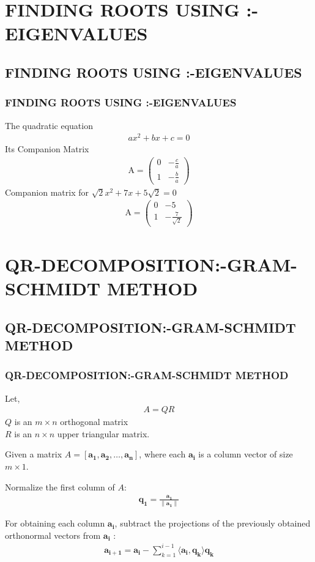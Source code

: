 \documentclass{beamer}
\theoremstyle{remark}
\providecommand{\norm}[1]{\lVert#1\rVert}
\newcommand{\myvec}[1]{\ensuremath{\begin{pmatrix}#1\end{pmatrix}}}
\let\vec\mathbf
\numberwithin{equation}{section}
\begin{document}
\section{FINDING ROOTS USING :-EIGENVALUES }
\subsection{FINDING ROOTS USING :-EIGENVALUES}
\begin{frame}
\frametitle{FINDING ROOTS USING :-EIGENVALUES}

The quadratic equation 
\begin{align}
ax^2 + bx + c = 0
\end{align}
Its Companion Matrix
\begin{align}
\text{A} =
\myvec{0 & -\frac{c}{a} \\
1 & -\frac{b}{a}
}
\end{align}
Companion matrix for $\sqrt{2}x^2 + 7x + 5\sqrt{2} = 0$
\begin{align}
\text{A} =
\myvec{0 & -5 \\
1 & -\frac{7}{\sqrt{2}}
}
\end{align}

\end{frame}


\section{QR-DECOMPOSITION:-GRAM-SCHMIDT METHOD}
\subsection{QR-DECOMPOSITION:-GRAM-SCHMIDT METHOD}
\begin{frame}
\frametitle{QR-DECOMPOSITION:-GRAM-SCHMIDT METHOD}
Let,
\begin{align}
A = QR
\end{align}
$Q$ is an $ m \times n $ orthogonal matrix\\
$R$ is an $n \times n$ upper triangular matrix.

Given a matrix $ A = [\vec{a_1}, \vec{a_2}, \dots, \vec{a_n}] $, where each $ \vec{a_i} $ is a column vector of size $ m \times 1 $.

Normalize the first column of $A$:
\begin{align}
\vec{q_1} = \frac{\vec{a_1}}{\norm{\vec{a_1}}}
\end{align}

For obtaining each column $ \vec{a_i} $, subtract the projections of the previously obtained orthonormal vectors from $ \vec{a_i} $ :
\begin{align}
\vec{a_{i+1}} = \vec{a_i} - \sum_{k=1}^{i-1} \langle \vec{a_i}, \vec{q_k} \rangle \vec{q_k}
\end{align}

\end{frame}
\end{document}
